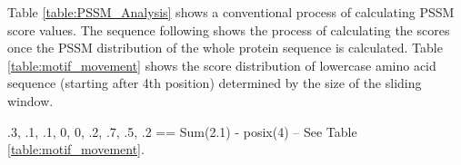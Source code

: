 Table \ref{table:PSSM_Analysis} shows a conventional process of calculating PSSM score values. The sequence following shows the process of calculating the scores once the PSSM distribution of the whole protein sequence is calculated. Table \ref{table:motif_movement} shows the score distribution of lowercase amino acid sequence (starting after 4th position) determined by the size of the sliding window.

\begin{displayquote}
  \label{example:fasta}
\end{displayquote}



    

.3, .1, .1, 0, 0, .2, .7, .5, .2  == Sum(2.1) - posix(4) -- See Table \ref{table:motif_movement}.


